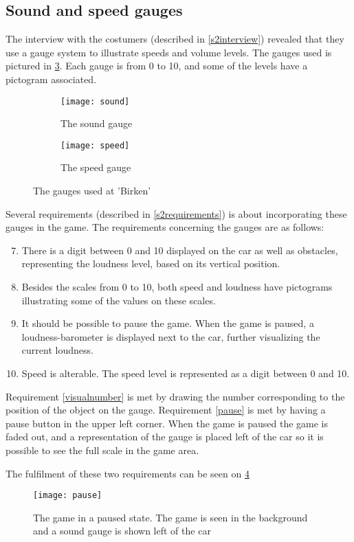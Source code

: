 \subsection{Sound and speed gauges}
The interview with the costumers (described in \cref{s2interview}) revealed that they use a gauge system to illustrate speeds and volume levels. 
The gauges used is pictured in \cref{gauges}.
Each gauge is from 0 to 10, and some of the levels have a pictogram associated.

\begin{figure}
	\centering
        \begin{subfigure}[b]{0.5\textwidth}
                \texttt{[image: sound]}
                \caption{The sound gauge}
                \label{sound}
        \end{subfigure}%
        \begin{subfigure}[b]{0.5\textwidth}
                \texttt{[image: speed]}
                \caption{The speed gauge}
                \label{speed}
        \end{subfigure}
        \caption{The gauges used at 'Birken'}\label{fig:animals}
        \label{gauges}
\end{figure}

Several requirements (described in \cref{s2requirements}) is about incorporating these gauges in the game.
The requirements concerning the gauges are as follows:

\begin{enumerate}
\setcounter{enumi}{6}
\item \label{visualnumber} There is a digit between 0 and 10 displayed on the car as well as obstacles, representing the loudness level, based on its vertical position. 
\item \label{pictogram} Besides the scales from 0 to 10, both speed and loudness have pictograms illustrating some of the values on these scales.
\item \label{pause} It should be possible to pause the game. When the game is paused, a loudness-barometer is displayed next to the car, further visualizing the current loudness.
\item \label{speeditem} Speed is alterable. The speed level is represented as a digit between 0 and 10.
\end{enumerate}

Requirement \ref{visualnumber} is met by drawing the number corresponding to the position of the object on the gauge. 
Requirement \ref{pause} is met by having a pause button in the upper left corner. 
When the game is paused the game is faded out, and a representation of the gauge is placed left of the car so it is possible to see the full scale in the game area.

The fulfilment of these two requirements can be seen on \cref{pausedstate}

\begin{figure}
\texttt{[image: pause]}	
\caption{The game in a paused state. The game is seen in the background and a sound gauge is shown left of the car}
\label{pausedstate}
\end{figure}


